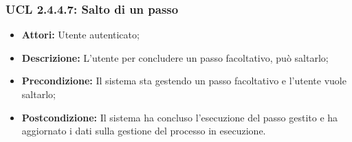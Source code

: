 \hypertarget{L2.4.4.7}{}
\subsubsection{UCL 2.4.4.7: Salto di un passo}
\begin{itemize}
\item \textbf{Attori:} Utente autenticato;
\item \textbf{Descrizione:} L'utente per concludere un passo facoltativo, può saltarlo;
\item \textbf{Precondizione:} Il sistema sta gestendo un passo facoltativo e l'utente vuole saltarlo;
\item \textbf{Postcondizione:} Il sistema ha concluso l'esecuzione del passo gestito e ha aggiornato i dati sulla gestione del processo in esecuzione.
\end{itemize}

\hypertarget{L2.4.5}{}
